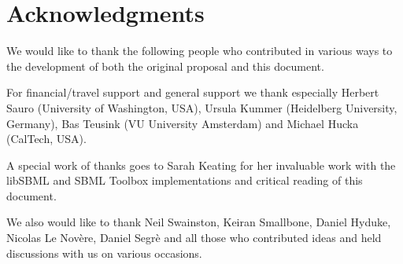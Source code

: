 
\section{Acknowledgments}

We would like to thank the following people who contributed in various ways to the development of both the original proposal and this document.

For financial/travel support and general support we thank especially Herbert Sauro (University of Washington, USA), Ursula Kummer (Heidelberg University, Germany), Bas Teusink (VU University Amsterdam) and Michael Hucka (CalTech, USA).

A special work of thanks goes to Sarah Keating for her invaluable work with  the \textsf{libSBML} and \textsf{SBML Toolbox} implementations and critical reading of this document.

We also would like to thank Neil Swainston, Keiran Smallbone, Daniel Hyduke, Nicolas Le Nov\`{e}re, Daniel Segr\`{e} and all those who contributed ideas and held discussions with us on various occasions.

